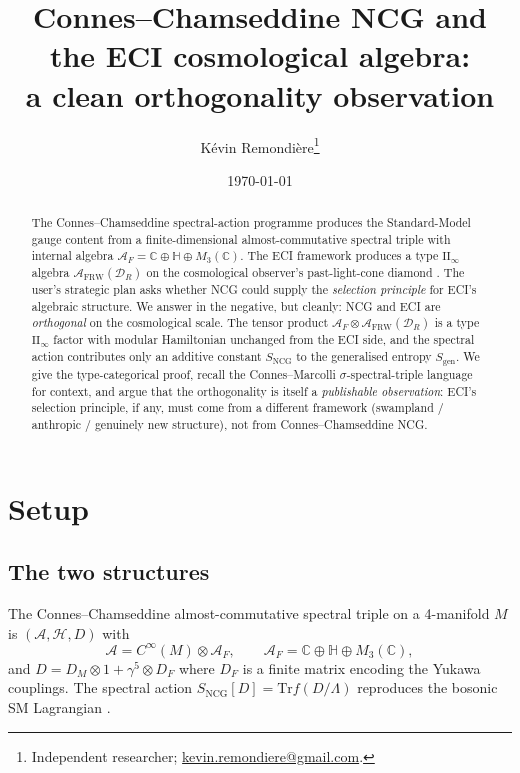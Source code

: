 \documentclass[11pt,a4paper]{article}
\title{Connes--Chamseddine NCG and the ECI cosmological algebra:\\
a clean orthogonality observation}
\author{K\'evin Remondi\`ere\thanks{Independent researcher; \href{mailto:kevin.remondiere@gmail.com}{kevin.remondiere@gmail.com}.}}
\date{\today}
\theoremstyle{definition}
\newcommand{\C}{\mathbb{C}}
\newcommand{\bbH}{\mathbb{H}}
\newcommand{\cA}{\mathcal{A}}
\newcommand{\cD}{\mathcal{D}}
\newcommand{\cH}{\mathcal{H}}
\newcommand{\Tr}{\mathrm{Tr}}
\newcommand{\NCG}{\mathrm{NCG}}
\newcommand{\FRW}{\mathrm{FRW}}
\newcommand{\gen}{\mathrm{gen}}
\begin{document}
\maketitle

\begin{abstract}
The Connes--Chamseddine spectral-action programme \cite{CCM07} produces the
Standard-Model gauge content from a finite-dimensional almost-commutative
spectral triple with internal algebra $\cA_F = \C\oplus\bbH\oplus M_3(\C)$.
The ECI framework produces a type $\mathrm{II}_\infty$ algebra
$\cA_\FRW(\cD_R)$ on the cosmological observer's past-light-cone diamond
\cite{Witten2022,BFV03,Connes73}. The user's strategic plan asks whether
NCG could supply the \emph{selection principle} for ECI's algebraic
structure. We answer in the negative, but cleanly: NCG and ECI are
\emph{orthogonal} on the cosmological scale. The tensor product
$\cA_F \otimes \cA_\FRW(\cD_R)$ is a type $\mathrm{II}_\infty$ factor
with modular Hamiltonian unchanged from the ECI side, and the
spectral action contributes only an additive constant $S_\NCG$ to the
generalised entropy $S_\gen$. We give the type-categorical proof,
recall the Connes--Marcolli $\sigma$-spectral-triple language for
context, and argue that the orthogonality is itself a
\emph{publishable observation}: ECI's selection principle, if any,
must come from a different framework (swampland / anthropic /
genuinely new structure), not from Connes--Chamseddine NCG.
\end{abstract}

\section{Setup}

\subsection{The two structures}

The Connes--Chamseddine almost-commutative spectral triple
\cite{CCM07} on a 4-manifold $M$ is $(\cA, \cH, D)$ with
\begin{equation}
\cA = C^\infty(M) \otimes \cA_F, \qquad
\cA_F = \C \oplus \bbH \oplus M_3(\C),
\end{equation}
and $D = D_M \otimes 1 + \gamma^5 \otimes D_F$ where $D_F$ is a finite
matrix encoding the Yukawa couplings. The spectral action
$S_\NCG[D] = \Tr f(D/\Lambda)$ reproduces the bosonic SM Lagrangian
\cite{CCM07}.
\end{document}
